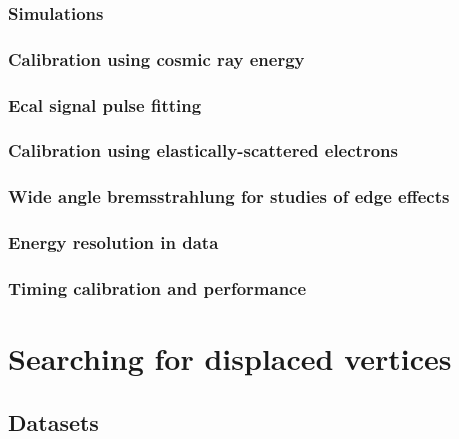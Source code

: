 \documentclass[12pt]{report}
\begin{document}
\subsection{Simulations}


\subsection{Calibration using cosmic ray energy}


\subsection{Ecal signal pulse fitting} \label{pulsefitting}


\subsection{Calibration using elastically-scattered electrons}


\subsection{Wide angle bremsstrahlung for studies of edge effects}


\subsection{Energy resolution in data}


\subsection{Timing calibration and performance}


\chapter{Searching for displaced vertices}%

\section{Datasets}
\end{document}

